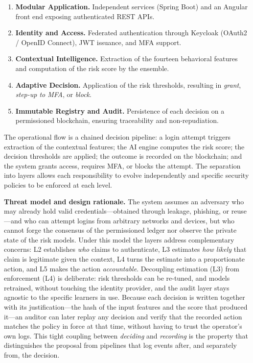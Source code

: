 \documentclass[conference]{IEEEtran}
\begin{document}
\begin{enumerate}
  \item \textbf{Modular Application.} Independent services (Spring
        Boot) and an Angular front end exposing authenticated REST APIs.
  \item \textbf{Identity and Access.} Federated authentication through
        Keycloak (OAuth2 / OpenID Connect), JWT issuance, and MFA
        support.
  \item \textbf{Contextual Intelligence.} Extraction of the fourteen
        behavioral features and computation of the risk score by the
        ensemble.
  \item \textbf{Adaptive Decision.} Application of the risk thresholds,
        resulting in \emph{grant}, \emph{step-up to MFA}, or
        \emph{block}.
  \item \textbf{Immutable Registry and Audit.} Persistence of each
        decision on a permissioned blockchain, ensuring traceability
        and non-repudiation.
\end{enumerate}

The operational flow is a chained decision pipeline: a login attempt
triggers extraction of the contextual features; the AI engine computes
the risk score; the decision thresholds are applied; the outcome is
recorded on the blockchain; and the system grants access, requires MFA,
or blocks the attempt. The separation into layers allows each
responsibility to evolve independently and specific security policies
to be enforced at each level.

\textbf{Threat model and design rationale.} The system assumes an
adversary who may already hold valid credentials---obtained through
leakage, phishing, or reuse---and who can attempt logins from arbitrary
networks and devices, but who cannot forge the consensus of the
permissioned ledger nor observe the private state of the risk models.
Under this model the layers address complementary concerns: L2
establishes \emph{who} claims to authenticate, L3 estimates \emph{how
likely} that claim is legitimate given the context, L4 turns the
estimate into a proportionate action, and L5 makes the action
\emph{accountable}. Decoupling estimation (L3) from enforcement (L4) is
deliberate: risk thresholds can be re-tuned, and models retrained,
without touching the identity provider, and the audit layer stays
agnostic to the specific learners in use. Because each decision is
written together with its justification---the hash of the input features
and the score that produced it---an auditor can later replay any
decision and verify that the recorded action matches the policy in force
at that time, without having to trust the operator's own logs. This
tight coupling between \emph{deciding} and \emph{recording} is the
property that distinguishes the proposal from pipelines that log events
after, and separately from, the decision.
\end{document}
